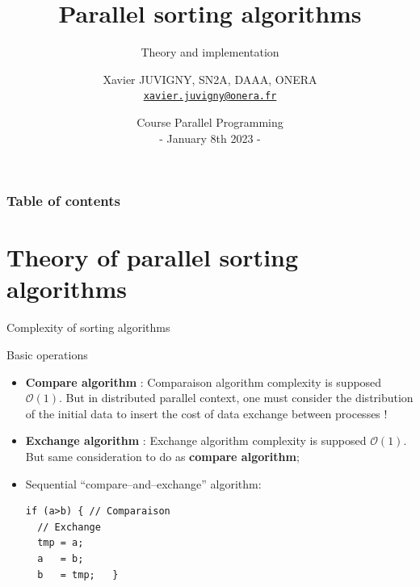 \documentclass[compress,10pt,aspectratio=169]{beamer}
\title[Parallel programming\hspace{2em}]{Parallel sorting algorithms}
\subtitle{Theory and implementation}
\author[X. JUVIGNY]{Xavier JUVIGNY, SN2A, DAAA, ONERA\\ \href{mailto:xavier.juvigny@onera.fr}{\texttt{xavier.juvigny@onera.fr}} }
\date[01/08/2023]{Course Parallel Programming\\- January 8th 2023 -}
\institute{\inst{1}ONERA,\inst{2}DAAA}
\begin{document}
\MakeTitlePage

\begin{frame}
\frametitle{Table of contents}
\begin{multicols}{2}
\tableofcontents[hideallsubsections]
\end{multicols}
\end{frame}

\section{Theory of parallel sorting algorithms}

\begin{frame}[fragile]{Complexity of sorting algorithms}
  \scriptsize
  \begin{block}{Basic operations}
    \begin{itemize}
    \item \textbf{Compare algorithm} : Comparaison algorithm complexity is supposed $\mathcal{O}(1)$. But in distributed parallel context, one must consider the distribution of the initial data
      to insert the cost of data exchange between processes !
    \item  \textbf{Exchange algorithm} : Exchange algorithm complexity is supposed $\mathcal{O}(1)$. But same consideration to do as \textbf{compare algorithm};
    \item Sequential ``compare--and--exchange'' algorithm:
\begin{verbatim}
if (a>b) { // Comparaison
  // Exchange
  tmp = a;
  a   = b;
  b   = tmp;   }
\end{verbatim}
    \end{itemize}
  \end{block}
\end{frame}
\end{document}

